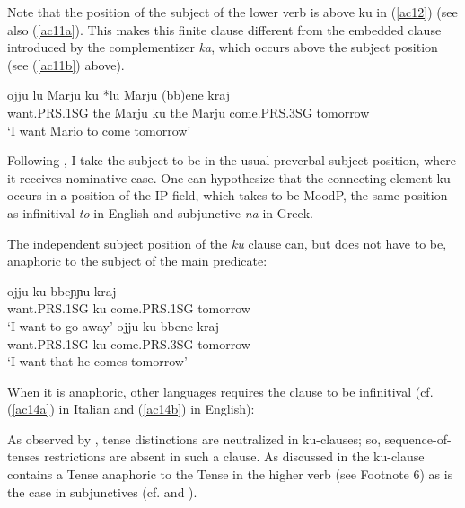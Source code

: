 \documentclass[output=paper]{langscibook}
\begin{document}
Note that the position of the subject of the lower verb is above ku in (\ref{ac12}) (see also (\ref{ac11a}). This makes this finite clause different from the embedded clause introduced by the complementizer \textit{ka}, which occurs above the subject position (see (\ref{ac11b}) above). 

\ea\label{ac12}
\gll ojju   {lu Marju} ku {*lu Marju} (bb)ene  kraj \\
 want.PRS.1SG {the Marju} ku {the Marju}  come.PRS.3SG tomorrow\\
\glt ‘I want Mario to come tomorrow’
\z

Following \cite[p36]{calabrese1993a}, I take the subject to be in the usual preverbal subject position, where it receives nominative case.  One can hypothesize that the connecting element ku occurs in a position of the IP field, which \cite{roberts2003a} takes to be MoodP, the same position as infinitival \textit{to} in English and subjunctive \textit{na} in Greek.

The independent subject position of the \textit{ku} clause can, but does not have to be, anaphoric to the subject of the main predicate:

\ea \label{ac13}
    \ea \label{ac13a}
        \gll ojju          ku   bbeɲɲu      kraj\\
   want.PRS.1SG   ku    come.PRS.1SG  tomorrow\\
    \glt   ‘I want to go away’
    \ex \label{ac13b}
        \gll ojju          ku   bbene       kraj \\
   want.PRS.1SG   ku   come.PRS.3SG  tomorrow\\
    \glt ‘I want that he comes tomorrow’
    \z
\z

When it is anaphoric, other languages requires the clause to be infinitival (cf. (\ref{ac14a}) in Italian and (\ref{ac14b}) in English):

\ea \label{ac14}
    \z
\z

 As observed by \cite{calabrese1993a}, tense distinctions are neutralized in ku-clauses; so, sequence-of-tenses restrictions are absent in such a clause.  As discussed in \cite{calabrese1993a} the ku-clause contains a Tense anaphoric to the Tense in the higher verb (see Footnote 6) as is the case in subjunctives (cf. \cite[p46-48]{calabrese1993a} and \cite[p652]{manzini2005a}).
\end{document}
